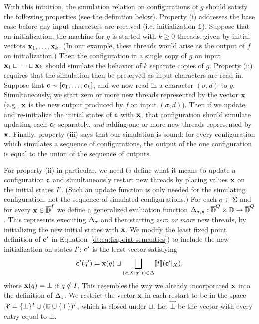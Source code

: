 With this intuition, the simulation relation on configurations of $g$ should satisfy the following properties (see the definition below). Property (i) addresses the base case before any input characters are received (i.e. initialization ${\texttt{i}}$). Suppose that on initialization, the machine for $g$ is started with $k \ge 0$ threads, given by initial vectors $\textbf{x}_1, \ldots, \textbf{x}_k$. (In our example, these threads would arise as the output of $f$ on initialization.) Then the configuration in a single copy of $g$ on input $\textbf{x}_1 \sqcup \cdots \sqcup \textbf{x}_k$ should simulate the behavior of $k$ separate copies of $g$. Property (ii) requires that the simulation then be preserved as input characters are read in. Suppose that $\textbf{c} \sim [\textbf{c}_1, \ldots, \textbf{c}_k]$, and we now read in a character $(\sigma,d)$ to $g$. Simultaneously, we start zero or more new threads represented by the vector $\textbf{x}$ (e.g., $\textbf{x}$ is the new output produced by $f$ on input $(\sigma, d)$). Then if we update and re-initialize the initial states of $\textbf{c}$ with $\textbf{x}$, that configuration should simulate updating each $\textbf{c}_i$ separately, \emph{and} adding one or more new threads represented by $\textbf{x}$. Finally, property (iii) says that our simulation is sound: for every configuration which simulates a sequence of configurations, the output of the one configuration is equal to the union of the sequence of outputs.

For property (ii) in particular, we need to define what it means to update a configuration $\textbf{c}$ and simultaneously restart new threads by placing values $\textbf{x}$ on the initial states $I'$. (Such an update function is only needed for the simulating configuration, not the sequence of simulated configurations.) For each $\sigma \in \Sigma$ and for every $\textbf{x} \in \overline{\mathbb{D}{}}^I$ we define a generalized evaluation function $\Delta_{\sigma,\textbf{x}}: \overline{\mathbb{D}{}}^Q \times \mathbb{D} \to \overline{\mathbb{D}{}}^Q$. This represents executing $\Delta_\sigma$ and then starting \emph{zero or more} new threads, by initializing the new initial states with $\textbf{x}$. We modify the least fixed point definition of $\textbf{c}'$ in Equation~\ref{dt:eq:fixpoint-semantics}) to include the new initialization on states $I'$: $\textbf{c}'$ is the least vector satisfying
\[
\textbf{c}'(q') = \textbf{x}(q) \sqcup \bigsqcup_{(\sigma, X, q', t) \in \Delta} \llbracket t \rrbracket(\textbf{c}'|_X),
\]
where $\textbf{x}(q) = \bot$ if $q \notin I$. This resembles the way we already incorporated $\textbf{x}$ into the definition of $\Delta_{\texttt{i}}$.
We restrict the vector $\textbf{x}$ in each restart to be in the space $\mathcal{X} = \{\bot\}^I \cup (\mathbb{D} \cup \{\top\})^I$, which is closed under $\sqcup$.
Let $\vec{\bot}$ be the vector with every entry equal to $\bot$.

